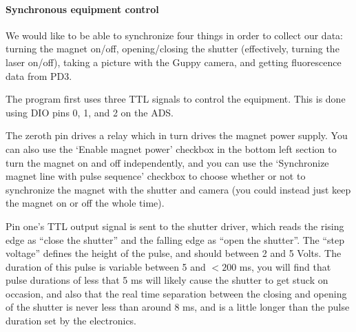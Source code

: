 \documentclass{../lab}
\begin{document}



\paragraph{Synchronous equipment control}

We would like to be able to synchronize four things in order to collect our data: turning the magnet on/off, opening/closing the shutter (effectively, turning the laser on/off), taking a picture with the Guppy camera, and getting fluorescence data from PD3.

The program first uses three TTL signals to control the equipment. This is done using DIO pins 0, 1, and 2 on the ADS. 

The zeroth pin drives a relay which in turn drives the magnet power supply. You can also use the `Enable magnet power' checkbox in the bottom left section to turn the magnet on and off independently, and you can use the `Synchronize magnet line with pulse sequence' checkbox to choose whether or not to synchronize the magnet with the shutter and camera (you could instead just keep the magnet on or off the whole time).

Pin one's TTL output signal is sent to the shutter driver, which reads the rising edge as ``close the shutter'' and the falling edge as ``open the shutter''. The ``step voltage'' defines the height of the pulse, and should between 2 and 5 Volts. The duration of this pulse is variable between 5 and $<200$ ms, you will find that pulse durations of less that 5 ms will likely cause the shutter to get stuck on occasion, and also that the real time separation between the closing and opening of the shutter is never less than around 8 ms, and is a little longer than the pulse duration set by the electronics.
\end{document}
